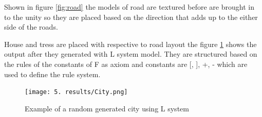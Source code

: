\renewcommand{\baselinestretch}{1.5}

\Large Shown in figure \ref{fig:road} the models of road are textured before are brought in to the unity so they are placed based on the direction that adds up to the either side of the roads.

\vspace{0.5cm}

\Large House and tress are placed with respective to road layout the figure \ref{fig:city} shows the output after they generated with L system model. They are structured based on the rules of the constants of F as axiom and constants are [, ], +, - which are used to define the rule system.

\begin{figure}[h]
\caption{Example of a random generated city using L system}
\label{fig:city}
\vspace{0.3cm}
\centering
\texttt{[image: 5. results/City.png]}
\end{figure}
